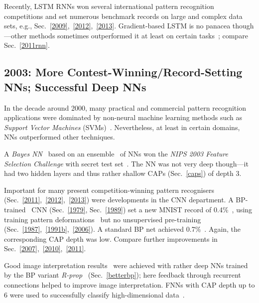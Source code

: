 \documentclass[letterpaper]{article}
\begin{document}
\begin{CJK*}{UTF8}{gbsn}
Recently, LSTM RNNs won several international pattern recognition competitions 
and set numerous benchmark records 
on large and complex data sets, e.g., 
Sec.~\ref{2009},~\ref{2012},~\ref{2013}.
Gradient-based LSTM is no panacea though---other methods sometimes outperformed  
it at least on certain tasks~\citep{Jaeger:04,Schmidhuber:07nc,Martens:2011hessfree,pascanu2013,icml2014}; compare Sec.~\ref{2011rnn}.





\subsection{2003: More Contest-Winning/Record-Setting NNs; Successful Deep NNs}
\label{2003}

In the decade around 2000, many practical and commercial
pattern recognition applications were dominated by non-neural
machine learning methods
such as {\em Support Vector Machines} (SVMs)~\citep{Vapnik:95,advkernel}.
Nevertheless, at least in certain domains, NNs 
outperformed other techniques.


A  {\em Bayes NN}~\citep{neal2006b} based on an ensemble~\citep{breiman:1996,Schapire:90,wolpert:92stacked,hashem:1992,Ueda2000,dietterich2000} of NNs won 
the  {\em NIPS 2003 Feature Selection Challenge}
with secret test set~\citep{neal2006}.
The NN was not very deep though---it had two hidden layers
and thus rather shallow CAPs (Sec.~\ref{caps}) of depth 3.

Important for many present competition-winning pattern recognisers  (Sec.~\ref{2011},~\ref{2012},~\ref{2013})
were developments in the CNN department.
A BP-trained~\citep{LeCun:89} CNN (Sec.~\ref{1979}, Sec.~\ref{1989}) 
set a new MNIST record of 0.4\%~\citep{simard:2003},
using training pattern
deformations~\citep{Baird90} but no unsupervised pre-training (Sec.~\ref{1987},~\ref{1991b},~\ref{2006}).
A standard BP net achieved 0.7\%~\citep{simard:2003}.
Again, the corresponding CAP depth was low. 
Compare further improvements in Sec.~\ref{2007},~\ref{2010},~\ref{2011}.



Good image interpretation results~\citep{Behnke:LNCS} were achieved with rather deep NNs trained by the 
BP variant {\em R-prop}~\citep{rprop93} (Sec.~\ref{betterbp});
here feedback through recurrent connections helped to improve image interpretation. 
FNNs with CAP depth up to 6 were used to successfully classify high-dimensional data~\citep{vieira2003}. 


\end{CJK*}
\end{document}
